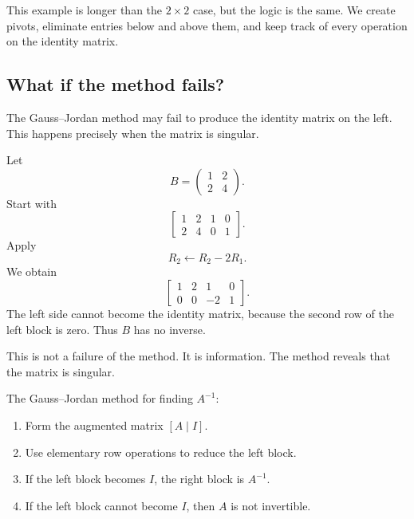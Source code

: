 This example is longer than the \(2\times2\) case, but the logic is the same. We create pivots, eliminate entries below and above them, and keep track of every operation on the identity matrix.

\subsection{What if the method fails?}

The Gauss--Jordan method may fail to produce the identity matrix on the left. This happens precisely when the matrix is singular.

\begin{examplebox}
Let
\[
B=\begin{pmatrix}
1&2\\
2&4
\end{pmatrix}.
\]
Start with
\[
\left[\begin{array}{cc|cc}
1&2&1&0\\
2&4&0&1
\end{array}\right].
\]
Apply
\[
R_2\leftarrow R_2-2R_1.
\]
We obtain
\[
\left[\begin{array}{cc|cc}
1&2&1&0\\
0&0&-2&1
\end{array}\right].
\]
The left side cannot become the identity matrix, because the second row of the left block is zero. Thus \(B\) has no inverse.
\end{examplebox}

This is not a failure of the method. It is information. The method reveals that the matrix is singular.

\begin{summarybox}
The Gauss--Jordan method for finding \(A^{-1}\):
\begin{enumerate}
\item Form the augmented matrix \([A\mid I]\).
\item Use elementary row operations to reduce the left block.
\item If the left block becomes \(I\), the right block is \(A^{-1}\).
\item If the left block cannot become \(I\), then \(A\) is not invertible.
\end{enumerate}
\end{summarybox}
